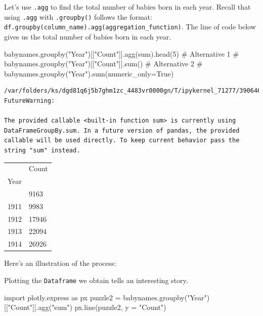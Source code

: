 \documentclass[
  letterpaper,
  DIV=11,
  numbers=noendperiod]{scrreprt}
\newenvironment{Shaded}{\begin{snugshade}}{\end{snugshade}}
\newcommand{\BuiltInTok}[1]{\textcolor[rgb]{0.00,0.23,0.31}{#1}}
\newcommand{\CommentTok}[1]{\textcolor[rgb]{0.37,0.37,0.37}{#1}}
\newcommand{\DecValTok}[1]{\textcolor[rgb]{0.68,0.00,0.00}{#1}}
\newcommand{\ImportTok}[1]{\textcolor[rgb]{0.00,0.46,0.62}{#1}}
\newcommand{\NormalTok}[1]{\textcolor[rgb]{0.00,0.23,0.31}{#1}}
\newcommand{\OperatorTok}[1]{\textcolor[rgb]{0.37,0.37,0.37}{#1}}
\newcommand{\StringTok}[1]{\textcolor[rgb]{0.13,0.47,0.30}{#1}}
\begin{document}
Let's use \texttt{.agg} to find the total number of babies born in each
year. Recall that using \texttt{.agg} with \texttt{.groupby()} follows
the format:
\texttt{df.groupby(column\_name).agg(aggregation\_function)}. The line
of code below gives us the total number of babies born in each year.

\begin{Shaded}
\begin{Highlighting}[]
\NormalTok{babynames.groupby(}\StringTok{"Year"}\NormalTok{)[[}\StringTok{"Count"}\NormalTok{]].agg(}\BuiltInTok{sum}\NormalTok{).head(}\DecValTok{5}\NormalTok{)}
\CommentTok{\# Alternative 1}
\CommentTok{\# babynames.groupby("Year")[["Count"]].sum()}
\CommentTok{\# Alternative 2}
\CommentTok{\# babynames.groupby("Year").sum(numeric\_only=True)}
\end{Highlighting}
\end{Shaded}

\begin{verbatim}
/var/folders/ks/dgd81q6j5b7ghm1zc_4483vr0000gn/T/ipykernel_71277/390646742.py:1: FutureWarning:

The provided callable <built-in function sum> is currently using DataFrameGroupBy.sum. In a future version of pandas, the provided callable will be used directly. To keep current behavior pass the string "sum" instead.
\end{verbatim}

\begin{longtable}[]{@{}ll@{}}
\toprule\noalign{}
& Count \\
Year & \\
\midrule\noalign{}
\endhead
\bottomrule\noalign{}
\endlastfoot
1910 & 9163 \\
1911 & 9983 \\
1912 & 17946 \\
1913 & 22094 \\
1914 & 26926 \\
\end{longtable}

Here's an illustration of the process:

Plotting the \texttt{Dataframe} we obtain tells an interesting story.

\begin{Shaded}
\begin{Highlighting}[]
\ImportTok{import}\NormalTok{ plotly.express }\ImportTok{as}\NormalTok{ px}
\NormalTok{puzzle2 }\OperatorTok{=}\NormalTok{ babynames.groupby(}\StringTok{"Year"}\NormalTok{)[[}\StringTok{"Count"}\NormalTok{]].agg(}\StringTok{"sum"}\NormalTok{)}
\NormalTok{px.line(puzzle2, y }\OperatorTok{=} \StringTok{"Count"}\NormalTok{)}
\end{Highlighting}
\end{Shaded}
\end{document}
